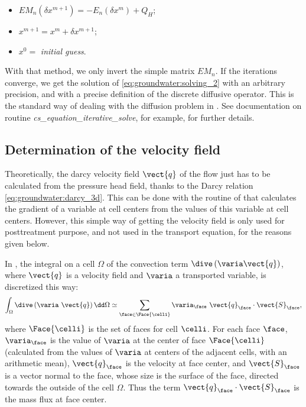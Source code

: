 \begin{itemize}
 \item[$\bullet$] $EM_n(\delta x^{m+1}) = - E_n(\delta x^{m}) + Q_H$;
 \item[$\bullet$] $x^{m+1} = x^m + \delta x^{m+1}$;
 \item[$\bullet$] $x^0 =$ \textit{initial guess}.
\end{itemize}
With that method, we only invert the simple matrix $EM_n$. If the iterations converge, we get the solution of \eqref{eq:groundwater:solving_2}
with an arbitrary precision, and with a precise definition of the discrete diffusive operator. This is the standard way
of dealing with the diffusion problem in \CS.
See documentation on routine \textit{cs\_equation\_iterative\_solve}, for example, for further details.

\subsection{Determination of the velocity field}
\label{sec:groundwater:velocity_field}
Theoretically, the darcy velocity field $\vect{q}$ of the flow just has to be calculated from the pressure head field, thanks to the Darcy relation
\eqref{eq:groundwater:darcy_3d}. This can be done with the routine of \CS that calculates the gradient of a variable at cell centers from the values of this
variable at cell centers.
However, this simple way of getting the velocity field is only used for posttreatment purpose,
and not used in the transport equation, for the reasons given below.

In \CS, the integral on a cell $\Omega$ of the convection term $\dive \left( \varia \vect{q} \right)$, where $\vect{q}$ is a velocity field
and $\varia$ a transported variable, is discretized this way:
\begin{equation}
 \label{eq:groundwater:discrete_convective}
\int_{\Omega} \dive \left( \varia \ \vect{q} \right) \dd \Omega \simeq \sum_{\face \in \Face{\celli}} \varia_\face \ \vect{q}_\face \cdot \vect{S}_\face,
\end{equation}
where $\Face{\celli}$ is the set of faces for cell $\celli$. For each face $\face$,
$\varia_\face$ is the value of $\varia$ at the center of face $\Face{\celli}$ (calculated from the values of $\varia$ at centers of the adjacent cells,
with an arithmetic mean), $\vect{q}_\face$ is the velocity at face center, and $\vect{S}_\face$ is a vector normal to the face,
whose size is the surface of the face, directed towards the outside of the cell $\Omega$.
Thus the term $\vect{q}_\face \cdot \vect{S}_\face$ is the mass flux at face center.

